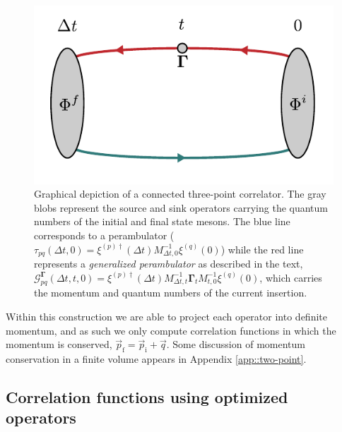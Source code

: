 \documentclass[twocolumn,amsmath,amssymb,prd,10pt,floatfix, 
superscriptaddress,nofootinbib, showpacs, preprintnumbers]{revtex4-1}
\begin{document}
\begin{figure}
\includegraphics[width=0.5\linewidth]{fig5.pdf}
\caption{Graphical depiction of a connected three-point correlator. The gray blobs represent the source and sink operators carrying the quantum numbers of the initial and final state mesons. The blue line corresponds to a perambulator ($\tau_{pq}(\Delta t,0) = \xi^{(p)\dag}(\Delta t) M^{-1}_{\Delta t,0} \xi^{(q)}(0)$) while the red line represents a \emph{generalized perambulator} as described in the text, $\mathcal{G}^\mathbf{\Gamma}_{pq}(\Delta t, t, 0) = \xi^{(p)\dag}(\Delta t) M^{-1}_{\Delta t, t} \mathbf{\Gamma}^{}_t M^{-1}_{t,0} \xi^{(q)}(0) $, which carries the momentum and quantum numbers of the current insertion. }
\end{figure}

Within this construction we are able to project each operator into definite momentum, and as such we only compute correlation functions in which the momentum is conserved, $\vec{p}_{\mathrm{f}} = \vec{p}_\mathrm{i} + \vec{q}$. Some discussion of momentum conservation in a finite volume appears in Appendix \ref{app::two-point}. 




\subsection{Correlation functions using optimized operators \label{ssec::three_points_optimized_ops}}
\end{document}
